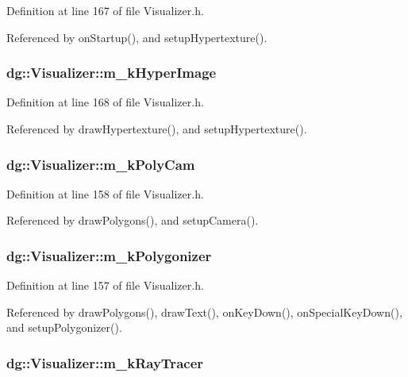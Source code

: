 Definition at line 167 of file Visualizer.h.

Referenced by on\-Startup(), and setup\-Hypertexture().
\subsubsection{ dg::Visualizer::m\_\-k\-Hyper\-Image\hspace{0.3cm}{\tt  [protected]}}\label{classdg_1_1Visualizer_n50}




Definition at line 168 of file Visualizer.h.

Referenced by draw\-Hypertexture(), and setup\-Hypertexture().
\subsubsection{ dg::Visualizer::m\_\-k\-Poly\-Cam\hspace{0.3cm}{\tt  [protected]}}\label{classdg_1_1Visualizer_n44}




Definition at line 158 of file Visualizer.h.

Referenced by draw\-Polygons(), and setup\-Camera().
\subsubsection{ dg::Visualizer::m\_\-k\-Polygonizer\hspace{0.3cm}{\tt  [protected]}}\label{classdg_1_1Visualizer_n43}




Definition at line 157 of file Visualizer.h.

Referenced by draw\-Polygons(), draw\-Text(), on\-Key\-Down(), on\-Special\-Key\-Down(), and setup\-Polygonizer().
\subsubsection{ dg::Visualizer::m\_\-k\-Ray\-Tracer\hspace{0.3cm}{\tt  [protected]}}\label{classdg_1_1Visualizer_n45}




